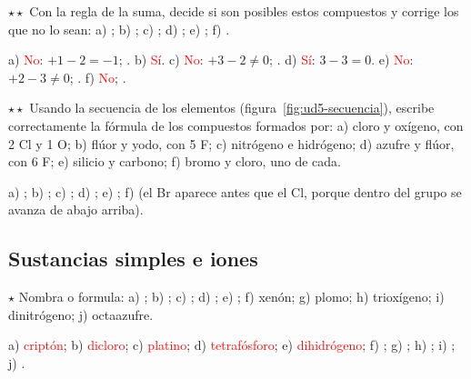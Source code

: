 \begin{exercise}
    \(\star\star\) Con la regla de la suma, decide si son posibles estos compuestos y corrige los que no lo sean: a) ;
    b) ; c) ; d) ; e) ; f) .
    \begin{solu}
        a) \textcolor{red}{No}: \(+1 - 2 = -1\); \textcolor{red}{}. b) \textcolor{red}{Sí}. c) \textcolor{red}{No}:
        \(+3 - 2 \neq 0\); \textcolor{red}{}. d) \textcolor{red}{Sí}: \(3 - 3 = 0\). e) \textcolor{red}{No}:
        \(+2 - 3 \neq 0\); \textcolor{red}{}. f) \textcolor{red}{No}; \textcolor{red}{}.
    \end{solu}
\end{exercise}

\begin{exercise}
    \(\star\star\) Usando la secuencia de los elementos (figura~\ref{fig:ud5-secuencia}), escribe correctamente la fórmula de los
    compuestos formados por: a) cloro y oxígeno, con 2 Cl y 1 O; b) flúor y yodo, con 5 F; c) nitrógeno e hidrógeno; d) azufre y
    flúor, con 6 F; e) silicio y carbono; f) bromo y cloro, uno de cada.
    \begin{solu}
        a) \textcolor{red}{}; b) \textcolor{red}{}; c) \textcolor{red}{}; d) \textcolor{red}{};
        e) \textcolor{red}{}; f) \textcolor{red}{} (el Br aparece antes que el Cl, porque dentro del grupo se avanza
        de abajo arriba).
    \end{solu}
\end{exercise}

\subsection{Sustancias simples e iones}

\begin{exercise}
    \(\star\) Nombra o formula: a) ; b) ; c) ; d) ; e) ; f) xenón; g) plomo; h) trioxígeno;
    i) dinitrógeno; j) octaazufre.
    \begin{solu}
        a) \textcolor{red}{criptón}; b) \textcolor{red}{dicloro}; c) \textcolor{red}{platino}; d) \textcolor{red}{tetrafósforo};
        e) \textcolor{red}{dihidrógeno}; f) \textcolor{red}{}; g) \textcolor{red}{}; h) \textcolor{red}{};
        i) \textcolor{red}{}; j) \textcolor{red}{}.
    \end{solu}
\end{exercise}

